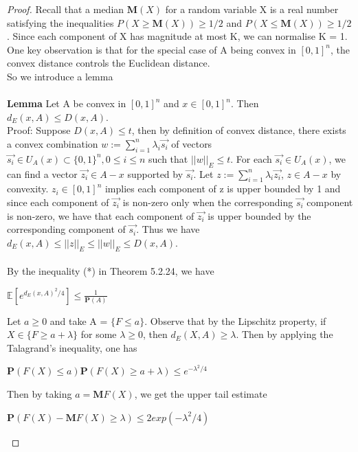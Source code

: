 \documentclass{article}
\begin{document}
\begin{proof}
    Recall that a median $\mathbf{M}(X)$ for a random variable X is a real number satisfying the inequalities $P(X \geq \mathbf{M}(X)) \geq 1/2$ and $P(X \leq \mathbf{M}(X)) \geq 1/2$. Since each component of X has magnitude at most K, we can normalise K = 1.\\
    One key observation is that for the special case of A being convex in $[0,1]^n$, the convex distance controls the Euclidean distance.\\
    So we introduce a lemma\\
    \\
    \textbf{Lemma} Let A be convex in $[0,1]^n$ and $x \in [0,1]^n$. Then $d_E(x, A) \leq D(x, A)$.\\
    Proof: Suppose $D(x,A) \leq t$, then by definition of convex distance,
    there exists a convex combination $w := \sum\limits_{i=1}^n \lambda_i \Vec{s_i}$ of vectors $\Vec{s_i} \in U_A(x) \subset \{0,1\}^n, 0 \leq i \leq n$ such that $||w||_E \leq t$. For each $\Vec{s_i} \in U_A(x)$, we can find a vector $\Vec{z_i} \in A - x$ supported by $\Vec{s_i}$. Let $z := \sum\limits_{i=1}^n \lambda_i \Vec{z_i}$, $z \in A-x$ by convexity. $z_i \in [0, 1]^n$ implies each component of z is upper bounded by 1 and since each component of $\Vec{z_i}$ is non-zero only when the corresponding $\Vec{s_i}$ component is non-zero, we have that each component of $\Vec{z_i}$ is upper bounded by the corresponding component of $\Vec{s_i}$. Thus we have $d_E(x, A) \leq ||z||_E \leq ||w||_E \leq D(x,A)$. \\
    \\
    By the inequality (*) in Theorem 5.2.24, we have
    \begin{center}
        $\mathbb{E}[e^{d_E(x,A)^2 / 4}] \leq \frac{1}{\mathbf{P}(A)}$
    \end{center}
    Let $a \geq 0$ and take A = $\{F \leq a\}$. Observe that by the Lipschitz property, if $X \in \{F \geq a+\lambda \}$ for some $\lambda \geq 0$, then $d_E(X, A) \geq \lambda$. Then by applying the Talagrand's inequality, one has
    \begin{center}
        $\mathbf{P}(F(X) \leq a)\mathbf{P}(F(X) \geq a+\lambda) \leq e^{-\lambda^2/4}$
    \end{center}
    Then by taking $a = \mathbf{M}F(X)$, we get the upper tail estimate
    \begin{center}
        $\mathbf{P}(F(X) - \mathbf{M}F(X) \geq \lambda) \leq 2exp(-\lambda^2/4)$
    \end{center}

\end{proof}
\end{document}

